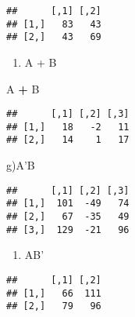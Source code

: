\documentclass[
]{article}
\newenvironment{Shaded}{\begin{snugshade}}{\end{snugshade}}
\newcommand{\KeywordTok}[1]{\textcolor[rgb]{0.13,0.29,0.53}{\textbf{#1}}}
\newcommand{\NormalTok}[1]{#1}
\newcommand{\OperatorTok}[1]{\textcolor[rgb]{0.81,0.36,0.00}{\textbf{#1}}}
\newcommand{\StringTok}[1]{\textcolor[rgb]{0.31,0.60,0.02}{#1}}
\providecommand{\tightlist}{%
  \setlength{\itemsep}{0pt}\setlength{\parskip}{0pt}}
\begin{document}
\begin{Shaded}
\end{Shaded}

\begin{verbatim}
##      [,1] [,2]
## [1,]   83   43
## [2,]   43   69
\end{verbatim}

\begin{enumerate}
\def\labelenumi{\alph{enumi})}
\setcounter{enumi}{5}
\tightlist
\item
  A + B
\end{enumerate}

\begin{Shaded}
\begin{Highlighting}[]
\NormalTok{A }\OperatorTok{+}\StringTok{ }\NormalTok{B}
\end{Highlighting}
\end{Shaded}

\begin{verbatim}
##      [,1] [,2] [,3]
## [1,]   18   -2   11
## [2,]   14    1   17
\end{verbatim}

g)A'B

\begin{Shaded}
\end{Shaded}

\begin{verbatim}
##      [,1] [,2] [,3]
## [1,]  101  -49   74
## [2,]   67  -35   49
## [3,]  129  -21   96
\end{verbatim}

\begin{enumerate}
\def\labelenumi{\alph{enumi})}
\setcounter{enumi}{7}
\tightlist
\item
  AB'
\end{enumerate}

\begin{Shaded}
\end{Shaded}

\begin{verbatim}
##      [,1] [,2]
## [1,]   66  111
## [2,]   79   96
\end{verbatim}
\end{document}
